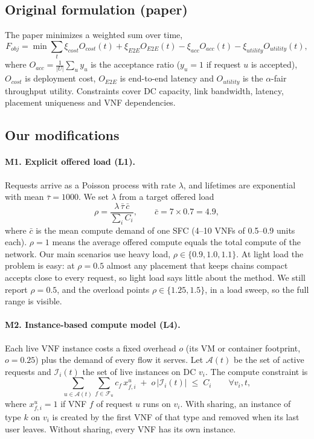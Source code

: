 \documentclass[11pt,a4paper]{article}
\begin{document}
\subsection{Original formulation (paper)}
The paper minimizes a weighted sum over time,
\begin{equation}
F_{obj} = \min \sum_{t} \xi_{cost} O_{cost}(t) + \xi_{E2E} O_{E2E}(t)
 - \xi_{acc} O_{acc}(t) - \xi_{utility} O_{utility}(t),
\end{equation}
where $O_{acc}=\frac{1}{|U|}\sum_u y_u$ is the acceptance ratio ($y_u=1$ if
request $u$ is accepted), $O_{cost}$ is deployment cost, $O_{E2E}$ is end-to-end
latency and $O_{utility}$ is the $\alpha$-fair throughput utility. Constraints
cover DC capacity, link bandwidth, latency, placement uniqueness and VNF
dependencies.

\subsection{Our modifications}

\paragraph{M1. Explicit offered load (L1).} Requests arrive as a Poisson process
with rate $\lambda$, and lifetimes are exponential with mean $\bar\tau=1000$. We
set $\lambda$ from a target offered load
\begin{equation}
\rho = \frac{\lambda\,\bar\tau\,\bar c}{\sum_{i} C_i},
\qquad \bar c = 7\times 0.7 = 4.9,
\end{equation}
where $\bar c$ is the mean compute demand of one SFC (4--10 VNFs of
0.5--0.9 units each). $\rho=1$ means the average offered compute equals the
total compute of the network. Our main scenarios use heavy load,
$\rho\in\{0.9, 1.0, 1.1\}$. At light load the problem is easy: at $\rho=0.5$
almost any placement that keeps chains compact accepts close to every request,
so light load says little about the method. We still report $\rho=0.5$, and the
overload points $\rho\in\{1.25, 1.5\}$, in a load sweep, so the full range is
visible.

\paragraph{M2. Instance-based compute model (L4).} Each live VNF instance costs a
fixed overhead $o$ (its VM or container footprint, $o=0.25$) plus the demand of
every flow it serves. Let $\mathcal{A}(t)$ be the set of active requests and
$\mathcal{I}_i(t)$ the set of live instances on DC $v_i$. The compute
constraint is
\begin{equation}
\sum_{u\in\mathcal{A}(t)} \sum_{f\in\mathcal{F}_u} c_f\, x^u_{f,i}
\;+\; o\,|\mathcal{I}_i(t)| \;\le\; C_i \qquad \forall v_i, t,
\end{equation}
where $x^u_{f,i}=1$ if VNF $f$ of request $u$ runs on $v_i$. With sharing, an
instance of type $k$ on $v_i$ is created by the first VNF of that type and
removed when its last user leaves. Without sharing, every VNF has its own
instance.
\end{document}
